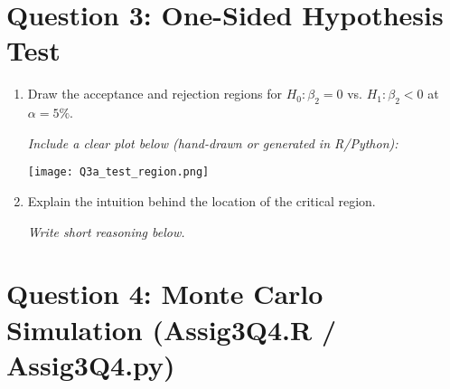 \documentclass[12pt,a4paper]{article}
\begin{document}
\newpage
\section*{Question 3: One-Sided Hypothesis Test}

\begin{enumerate}[label=(\alph*)]
  \item Draw the acceptance and rejection regions for $H_0: \beta_2 = 0$ vs. $H_1: \beta_2 < 0$ at $\alpha=5\%$.

  \textit{Include a clear plot below (hand-drawn or generated in R/Python):}
  \begin{center}
  \texttt{[image: Q3a\_test\_region.png]}
  \end{center}

  \item Explain the intuition behind the location of the critical region.

  \textit{Write short reasoning below.}
\end{enumerate}

\newpage
\section*{Question 4: Monte Carlo Simulation (Assig3Q4.R / Assig3Q4.py)}
\end{document}
